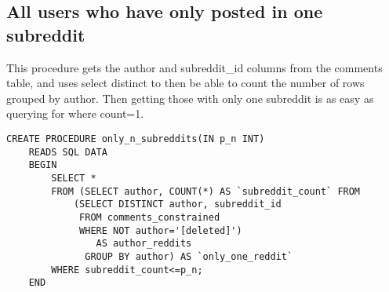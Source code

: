     \subsection{All users who have only posted in one subreddit} \label{subsec:only-one-subreddit}

    This procedure gets the author and subreddit\_id columns from the comments table, and uses select distinct to
    then be able to count the number of rows grouped by author.
    Then getting those with only one subreddit is as easy as querying for where count=1.

    \begin{verbatim}
CREATE PROCEDURE only_n_subreddits(IN p_n INT)
    READS SQL DATA
    BEGIN
        SELECT *
        FROM (SELECT author, COUNT(*) AS `subreddit_count` FROM
            (SELECT DISTINCT author, subreddit_id
             FROM comments_constrained
             WHERE NOT author='[deleted]')
                AS author_reddits
              GROUP BY author) AS `only_one_reddit`
        WHERE subreddit_count<=p_n;
    END
    \end{verbatim}